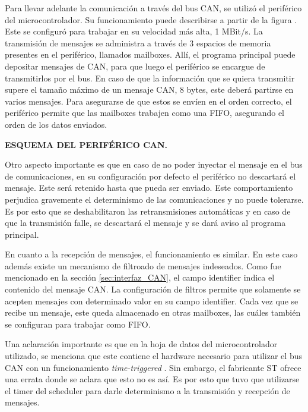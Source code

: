 
Para llevar adelante la comunicación a través del bus CAN, se utilizó el periférico del microcontrolador. Su funcionamiento puede describirse a partir de la figura  . Este se configuró para trabajar en su velocidad más alta, 1 MBit/s. La transmisión de mensajes se administra a través de 3 espacios de memoria presentes en el periférico, llamados mailboxes. Allí, el programa principal puede depositar mensajes de CAN, para que luego el periférico se encargue de transmitirlos por el bus. En caso de que la información que se quiera transmitir supere el tamaño máximo de un mensaje CAN, 8 bytes, este deberá partirse en varios mensajes. Para asegurarse de que estos se envíen en el orden correcto, el periférico permite que las mailboxes trabajen como una FIFO, asegurando el orden de los datos enviados.

{\Large \textbf{{\color{red} ESQUEMA DEL PERIFÉRICO CAN.}}}

Otro aspecto importante es que en caso de no poder inyectar el mensaje en el bus de comunicaciones, en su configuración por defecto el periférico no descartará el mensaje. Este será retenido hasta que pueda ser enviado. Este comportamiento perjudica gravemente el determinismo de las comunicaciones y no puede tolerarse. Es por esto que se deshabilitaron las retransmisiones automáticas y en caso de que la transmisión falle, se descartará el mensaje y se dará aviso al programa principal.

En cuanto a la recepción de mensajes, el funcionamiento es similar. En este caso además existe un mecanismo de filtroado de mensajes indeseados. Como fue mencionado en la sección \ref{sec:interfaz_CAN}, el campo identifier indica el contenido del mensaje CAN. La configuración de filtros permite que solamente se acepten mensajes con determinado valor en su campo identifier. Cada vez que se recibe un mensaje, este queda almacenado en otras mailboxes, las cuáles también se configuran para trabajar como FIFO.


Una aclaración importante es que en la hoja de datos del microcontrolador utilizado, se menciona que este contiene el hardware necesario para utilizar el bus CAN con un funcionamiento \textit{time-triggered} \cite[p.~1295]{RM0385}. Sin embargo, el fabricante ST ofrece una errata \cite{STM32F746_errata} donde se aclara que esto no es así. Es por esto que tuvo que utilizarse el timer del scheduler para darle determinismo a la transmisión y recepción de mensajes.


